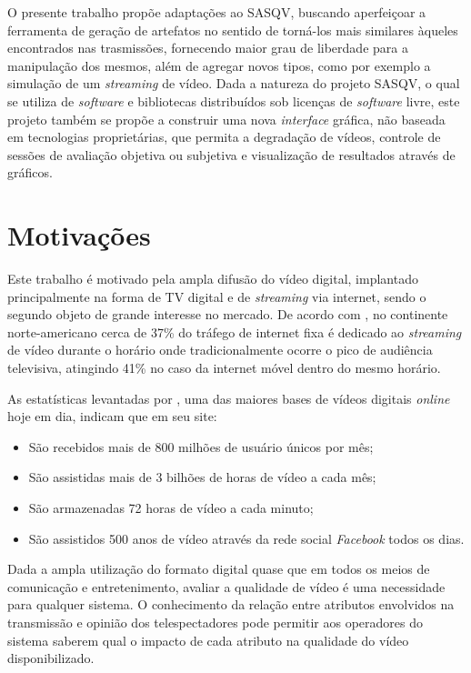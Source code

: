 O presente trabalho propõe adaptações ao SASQV, buscando aperfeiçoar a ferramenta de geração de artefatos no sentido de torná-los mais similares àqueles encontrados nas trasmissões, fornecendo maior grau de liberdade para a manipulação dos mesmos, além de agregar novos tipos, como por exemplo a simulação de um \emph{streaming} de vídeo. Dada a natureza do projeto SASQV, o qual se utiliza de \emph{software} e bibliotecas distribuídos sob licenças de \emph{software} livre, este projeto também se propõe a construir uma nova \emph{interface} gráfica, não baseada em tecnologias proprietárias, que permita a degradação de vídeos, controle de sessões de avaliação objetiva ou subjetiva e visualização de resultados através de gráficos.

\section{Motivações}

Este trabalho é motivado pela ampla difusão do vídeo digital, implantado principalmente na forma de TV digital e de \emph{streaming} via internet, sendo o segundo objeto de grande interesse no mercado. De acordo com \cite{sandvinereport}, no continente norte-americano cerca de 37\% do tráfego de internet fixa é dedicado ao \emph{streaming} de vídeo durante o horário onde tradicionalmente ocorre o pico de audiência televisiva, atingindo 41\% no caso da internet móvel dentro do mesmo horário.

As estatísticas levantadas por \cite{statsyoutube}, uma das maiores bases de vídeos digitais \emph{online} hoje em dia, indicam que em seu site:
\begin{itemize}
    \item São recebidos mais de 800 milhões de usuário únicos por mês;
    \item São assistidas mais de 3 bilhões de horas de vídeo a cada mês;
    \item São armazenadas 72 horas de vídeo a cada minuto;
    \item São assistidos 500 anos de vídeo através da rede social \emph{Facebook} todos os dias.
\end{itemize}

Dada a ampla utilização do formato digital quase que em todos os meios de comunicação e entretenimento, avaliar a qualidade de vídeo é uma necessidade para qualquer sistema. O conhecimento da relação entre atributos envolvidos na transmissão e opinião dos telespectadores pode permitir aos operadores do sistema saberem qual o impacto de cada atributo na qualidade do vídeo disponibilizado.

